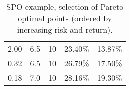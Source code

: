 \documentclass[openany]{now}
\begin{document}
\begin{table}
\begin{center}
\begin{tabular}{rrl|ll}
    2.00 &                      6.5 &                     10 &  23.40\% &  13.87\% \\
    0.32 &                      6.5 &                     10 &  26.79\% &  17.50\% \\
    0.18 &                      7.0 &                     10 &  28.16\% &  19.30\% \\
\bottomrule
\end{tabular}
\end{center}
\caption{SPO example, selection of Pareto optimal points (ordered by increasing risk and return).}
\label{tab:spo_pareto}
\end{table}
\end{document}
